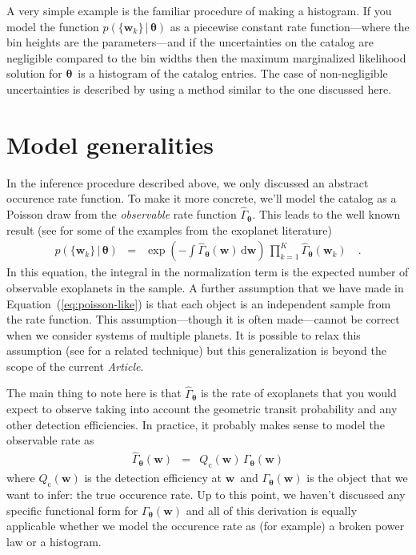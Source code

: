 \documentclass[12pt,preprint]{aastex}
\newcommand{\paper}{\textsl{Article}}
\newcommand{\Eq}[1]{Equation~(\ref{eq:#1})}
\newcommand{\eq}[1]{\Eq{#1}}
\newcommand{\eqlabel}[1]{\label{eq:#1}}
\newcommand{\dd}{\ensuremath{\,\mathrm{d}}}
\newcommand{\bvec}[1]{\ensuremath{\boldsymbol{#1}}}
\newcommand{\rate}{\ensuremath{\Gamma}}
\newcommand{\ratepar}{{\ensuremath{\theta}}}
\newcommand{\ratepars}{{\ensuremath{\bvec{\ratepar}}}}
\newcommand{\obs}[1]{\ensuremath{\hat{#1}}}
\newcommand{\completeness}{{\ensuremath{Q_\mathrm{c}}}}
\newcommand{\entry}{{\ensuremath{\bvec{w}}}}
\begin{document}
A very simple example is the familiar procedure of making a histogram.
If you model the function $p(\{\entry_k\}\,|\,\ratepars)$ as a piecewise
constant rate function---where the bin heights are the parameters---and if the
uncertainties on the catalog are negligible compared to the bin widths then
the maximum marginalized likelihood solution for \ratepars\ is a histogram of
the catalog entries.
The case of non-negligible uncertainties is described by \citet{hogge} using a
method similar to the one discussed here.

\section{Model generalities}

In the inference procedure described above, we only discussed an abstract
occurence rate function.
To make it more concrete, we'll model the catalog as a Poisson draw from the
\emph{observable} rate function $\obs{\rate}_\ratepars$.
This leads to the well known result (see \citealt{tabachnik,youdin} for some
of the examples from the exoplanet literature)
\begin{eqnarray}\eqlabel{poisson-like}
p(\{\entry_k\}\,|\,\ratepars) &=&
    \exp\left(-\int \obs{\rate}_\ratepars (\entry) \dd\entry\right) \,
    \prod_{k=1}^K \obs{\rate}_\ratepars (\entry_k)\quad.
\end{eqnarray}
In this equation, the integral in the normalization term is the expected
number of observable exoplanets in the sample.
A further assumption that we have made in \eq{poisson-like} is that each
object is an independent sample from the rate function.
This assumption---though it is often made---cannot be correct when we consider
systems of multiple planets.
It is possible to relax this assumption (see \citealt{tremaine} for a related
technique) but this generalization is beyond the scope of the current \paper.

The main thing to note here is that $\obs{\rate}_\ratepars$ is the rate of
exoplanets that you would expect to observe taking into account the geometric
transit probability and any other detection efficiencies.
In practice, it probably makes sense to model the observable rate as
\begin{eqnarray}
\obs{\rate}_\ratepars(\entry) &=&
    \completeness(\entry)\,\rate_\ratepars(\entry)
\end{eqnarray}
where $\completeness(\entry)$ is the detection efficiency at \entry\ and
$\rate_\ratepars(\entry)$ is the object that we want to infer: the true
occurence rate.
Up to this point, we haven't discussed any specific functional form for
$\rate_\ratepars(\entry)$ and all of this derivation is equally applicable
whether we model the occurence rate as (for example) a broken power law or
a histogram.
\end{document}
